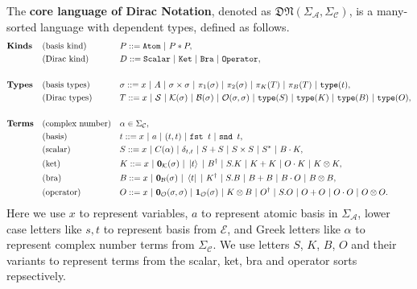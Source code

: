 \documentclass[manuscript, review, timestamp]{acmart}
\newcommand*{\Sc}{\mathcal{S}}
\newcommand*{\K}{\mathcal{K}}
\newcommand*{\B}{\mathcal{B}}
\newcommand*{\Op}{\mathcal{O}}
\newcommand*{\type}{\texttt{type}}
\newcommand*{\fst}{\texttt{fst }}
\newcommand*{\snd}{\texttt{snd }}
\begin{document}
\begin{definition}
  The \textbf{core language of Dirac Notation}, denoted as $\mathfrak{DN}(\Sigma_\mathcal{A}, \Sigma_\mathcal{C})$, is a many-sorted language with dependent types, defined as follows.
  \begin{align*}
    & \textbf{Kinds} && \textrm{(basis kind)} && P ::= \texttt{Atom}\ |\ P * P, \\
    & && \textrm{(Dirac kind)} && D ::= \texttt{Scalar}\ |\ \texttt{Ket}\ |\ \texttt{Bra}\ |\ \texttt{Operator}, \\
    \\
    & \textbf{Types} && \textrm{(basis types)} && \sigma ::= x\ |\ A\ |\ \sigma \times \sigma\ |\ \pi_1(\sigma)\ |\ \pi_2(\sigma)\ |\ \pi_K(T)\ |\ \pi_B(T)\ |\ \type(t), \\
    & && \textrm{(Dirac types)} && T ::= x\ |\ \Sc\ |\ \K(\sigma)\ |\ \B(\sigma)\ |\ \Op(\sigma, \sigma)\ |\ \type(S)\ |\ \type(K)\ |\ \type(B)\ |\ \type(O), \\
    \\
    & \textbf{Terms} && \textrm{(complex number)} && \alpha \in \Sigma_\mathcal{C}, \\
    & && \textrm{(basis)} && t ::= x\ |\ a\ |\ (t, t)\ |\ \fst t\ |\ \snd t, \\
    & && \textrm{(scalar)} && S ::= x\ |\ C(\alpha)\ |\ \delta_{t, t}\ |\ S + S\ |\ S \times S\ |\ S^*\ |\ B \cdot K, \\
    & && \textrm{(ket)} && K ::= x\ |\ \mathbf{0}_\mathcal{K}(\sigma)\ |\ \ket{t}\ |\ B^\dagger\ |\ S.K\ |\ K + K\ |\ O \cdot K\ |\ K \otimes K, \\
    & && \textrm{(bra)} && B ::= x\ |\ \mathbf{0}_\mathcal{B}(\sigma)\ |\ \bra{t}\ |\ K^\dagger\ |\ S.B\ |\ B + B\ |\ B \cdot O\ |\ B \otimes B, \\
    & && \textrm{(operator)} && O ::= x\ |\ \mathbf{0}_\mathcal{O}(\sigma, \sigma)\ |\ \mathbf{1}_\mathcal{O}(\sigma)\ |\ K \otimes B\ |\ O^\dagger\ |\ S.O\ |\ O + O\ |\ O \cdot O\ |\ O \otimes O.
  \end{align*}
  Here we use $x$ to represent variables, $a$ to represent atomic basis in $\Sigma_\mathcal{A}$, lower case letters like $s, t$ to represent basis from $\mathcal{E}$, and Greek letters like $\alpha$ to represent complex number terms from $\Sigma_\mathcal{C}$. We use letters $S$, $K$, $B$, $O$ and their variants to represent terms from the scalar, ket, bra and operator sorts repsectively.
\end{definition}
\end{document}
